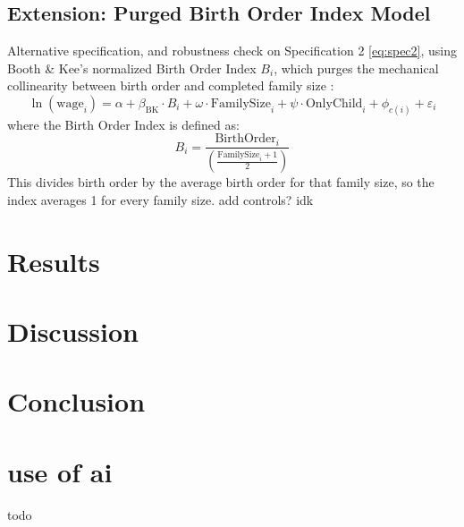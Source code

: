 \documentclass[12pt]{article}
\begin{document}
\subsection*{Extension: Purged Birth Order Index Model}
Alternative specification, and robustness check on Specification 2 \eqref{eq:spec2}, using Booth \& Kee's normalized Birth Order Index $B_i$, which purges the mechanical collinearity between birth order and completed family size \citep{booth}:
\begin{equation}
\ln(\text{wage}_{i}) = \alpha + \beta_{\text{BK}} \cdot B_i + \omega \cdot \text{FamilySize}_i + \psi \cdot \text{OnlyChild}_i + \phi_{c(i)} + \varepsilon_{i} \label{eq:index}
\end{equation}
where the Birth Order Index is defined as:
\begin{equation}
B_i = \frac{\text{BirthOrder}_i}{\left( \frac{\text{FamilySize}_i + 1}{2} \right)} \label{eq:bindex}
\end{equation}
This divides birth order by the average birth order for that family size, so the index averages 1 for every family size. add controls? idk

\section{Results}

\section{Discussion}

\section{Conclusion}

\section{use of ai}
todo
\end{document}
